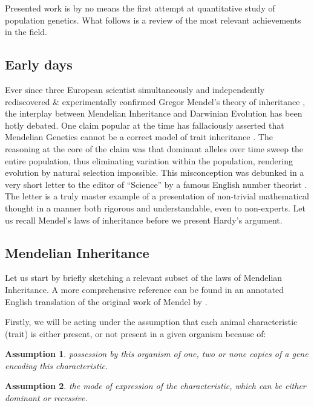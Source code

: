 \documentclass{l4proj}
\newtheorem{assum}{Assumption}
\begin{document}
Presented work is by no means the first attempt at quantitative study of population genetics. What follows is a review of the most relevant achievements in the field.

\subsection{Early days}
Ever since three European scientist simultaneously and independently rediscovered \& experimentally confirmed Gregor Mendel's theory of inheritance \parencite{DeVries00, Tschermak00, Correns00}, the interplay between Mendelian Inheritance and Darwinian Evolution has been hotly debated. One claim popular at the time has fallaciously asserted that Mendelian Genetics cannot be a correct model of trait inheritance \parencite{Yule02}. The reasoning at the core of the claim was that \gls{dominant} alleles over time sweep the entire population, thus eliminating variation within the population, rendering evolution by natural selection impossible. This misconception was debunked in a very short letter to the editor of ``Science'' by a famous English number theorist \parencite{hardy08}. The letter is a truly master example of a presentation of non-trivial mathematical thought in a manner both rigorous and understandable, even to non-experts. Let us recall Mendel's laws of inheritance before we present Hardy's argument.

\subsection{Mendelian Inheritance}

Let us start by briefly sketching a relevant subset of the laws of Mendelian Inheritance. A more comprehensive reference can be found in an annotated English translation of the original work of Mendel by \cite{mendel}.

Firstly, we will be acting under the assumption that each animal characteristic (trait) is either present, or not present in a given organism because of:
\begin{assum}\label{genotypes}
  possession by this organism of one, two or none copies of a gene encoding this characteristic.
\end{assum}

\begin{assum}\label{dominance}
  the mode of expression of the characteristic, which can be either \gls{dominant} or \gls{recessive}.
\end{assum}
\end{document}
